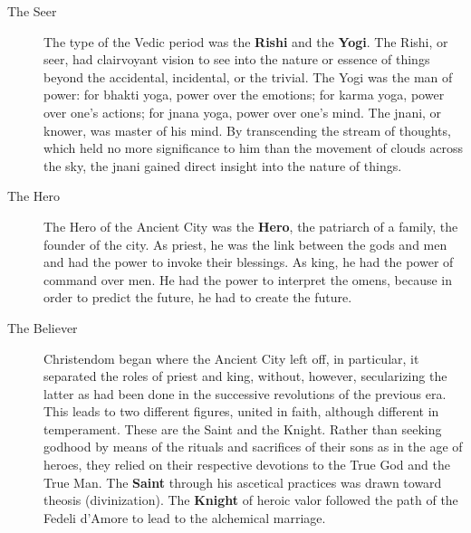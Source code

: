 \begin{description}
\item[The Seer ]

The type of the Vedic period was the \textbf{Rishi} and the \textbf{Yogi}. The Rishi, or seer, had clairvoyant vision to see into the nature or essence of things beyond the accidental, incidental, or the trivial. The Yogi was the man of power: for bhakti yoga, power over the emotions; for karma yoga, power over one's actions; for jnana yoga, power over one's mind. The jnani, or knower, was master of his mind. By transcending the stream of thoughts, which held no more significance to him than the movement of clouds across the sky, the jnani gained direct insight into the nature of things. 

\item[The Hero ]

The Hero of the Ancient City was the \textbf{Hero}, the patriarch of a family, the founder of the city. As priest, he was the link between the gods and men and had the power to invoke their blessings. As king, he had the power of command over men. He had the power to interpret the omens, because in order to predict the future, he had to create the future. 

\item[The Believer ]

Christendom began where the Ancient City left off, in particular, it separated the roles of priest and king, without, however, secularizing the latter as had been done in the successive revolutions of the previous era. This leads to two different figures, united in faith, although different in temperament. These are the Saint and the Knight. Rather than seeking godhood by means of the rituals and sacrifices of their sons as in the age of heroes, they relied on their respective devotions to the True God and the True Man. The \textbf{Saint} through his ascetical practices was drawn toward theosis (divinization). The \textbf{Knight} of heroic valor followed the path of the Fedeli d'Amore to lead to the alchemical marriage. 

\end{description}
